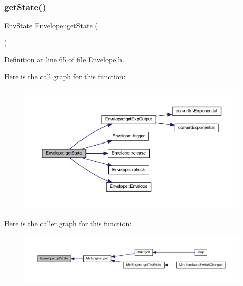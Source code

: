 \subsubsection{\texorpdfstring{get\+State()}{getState()}}
{\footnotesize\ttfamily \hyperlink{class_envelope_a16c15d3d555a1a27869f48696f430d5f}{Env\+State} Envelope\+::get\+State (\begin{DoxyParamCaption}{ }\end{DoxyParamCaption})\hspace{0.3cm}{\ttfamily [inline]}}



Definition at line 65 of file Envelope.\+h.

Here is the call graph for this function\+:
\nopagebreak
\begin{figure}[H]
\begin{center}
\leavevmode
\includegraphics[width=350pt]{class_envelope_a1d3627f6be1cce69aae37575b9bcdc69_cgraph}
\end{center}
\end{figure}
Here is the caller graph for this function\+:
\nopagebreak
\begin{figure}[H]
\begin{center}
\leavevmode
\includegraphics[width=350pt]{class_envelope_a1d3627f6be1cce69aae37575b9bcdc69_icgraph}
\end{center}
\end{figure}
\mbox{\label{class_envelope_a4cc2bb1ba420ecd053c4a1ad8ed0ab7d}} 
